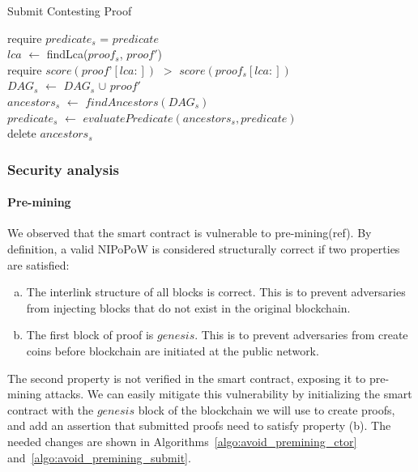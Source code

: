 \begin{algorithm}
    \caption{Submit Contesting Proof}
    \label{algo:contest_old}
    require $predicate_{s}$ = $predicate$\\
    $lca$ $\leftarrow$ findLca($proof_{s}$, $proof'$)\\
    require $score(proof’[lca:])$ $>$ $score(proof_{s}[lca:])$ \\
    $DAG_{s}$ $\leftarrow$ $DAG_{s}$ $\cup$ $proof'$\\
    $ancestors_{s}$ $\leftarrow$ $findAncestors(DAG_{s})$\\
    $predicate_{s}$ $\leftarrow$ $evaluatePredicate(ancestors_{s},
    predicate)$\\
    delete $ancestors_{s}$\\
\end{algorithm}

\subsubsection{Security analysis}

\paragraph{Pre-mining}
We observed that the smart contract is vulnerable to pre-mining(ref). By
definition, a valid NIPoPoW is considered structurally correct if two
properties are satisfied:

\begin{enumerate}[(a)]

\item The interlink structure of all blocks is correct. This is to prevent
    adversaries from injecting blocks that do not exist in the original
    blockchain.

\item The first block of proof is $genesis$. This is to prevent adversaries
    from create coins before blockchain are initiated at the public network.

\end{enumerate}

The second property is not verified in the smart contract, exposing it to
pre-mining attacks. We can easily mitigate this vulnerability by initializing
the smart contract with the $genesis$ block of the blockchain we will use to
create proofs, and add an assertion that submitted proofs need to satisfy
property (b).  The needed changes are shown in
Algorithms~\ref{algo:avoid_premining_ctor}
and~\ref{algo:avoid_premining_submit}.

